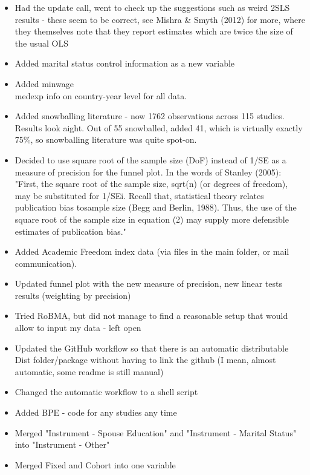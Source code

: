 \begin{itemize}
    \item Had the update call, went to check up the suggestions such as weird 2SLS results - these seem to be correct, see Mishra \& Smyth (2012) for more, where they themselves note that they report estimates which are twice the size of the usual OLS
    \item Added marital status control information as a new variable
    \item Added minwage\\medexp info on country-year level for all data.
    \item Added snowballing literature - now 1762 observations across 115 studies. Results look aight. Out of 55 snowballed, added 41, which is virtually exactly 75\%, so snowballing literature was quite spot-on.
    \item Decided to use square root of the sample size (DoF) instead of 1/SE as a measure of precision for the funnel plot. In the words of Stanley (2005): "First, the square root of the sample size, sqrt(n) (or degrees of freedom), may be substituted for 1/SEi. Recall that, statistical theory relates publication bias tosample size (Begg and Berlin, 1988). Thus, the use of the square root of the sample size in equation (2) may supply more defensible estimates of publication bias."
    \item Added Academic Freedom index data (via files in the main folder, or mail communication).
    \item Updated funnel plot with the new measure of precision, new linear tests results (weighting by precision)
    \item Tried RoBMA, but did not manage to find a reasonable setup that would allow to input my data - left open
    \item Updated the GitHub workflow so that there is an automatic distributable Dist folder/package without having to link the github (I mean, almost automatic, some readme is still manual)
    \item Changed the automatic workflow to a shell script
    \item Added BPE - code for any studies any time
    \item Merged "Instrument - Spouse Education" and "Instrument - Marital Status" into "Instrument - Other"
    \item Merged Fixed and Cohort into one variable
    
    
\end{itemize}

